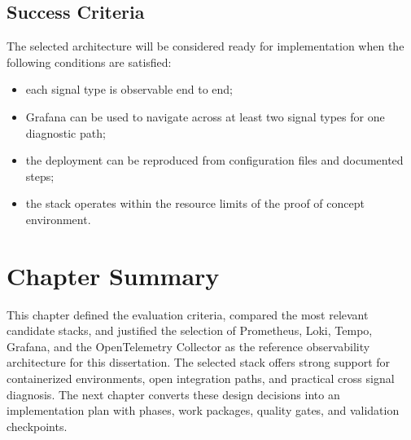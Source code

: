 \subsection{Success Criteria}
\label{subsec:validation_plan}

The selected architecture will be considered ready for implementation when the following conditions are satisfied:
\begin{itemize}
    \item each signal type is observable end to end;
    \item Grafana can be used to navigate across at least two signal types for one diagnostic path;
    \item the deployment can be reproduced from configuration files and documented steps;
    \item the stack operates within the resource limits of the proof of concept environment.
\end{itemize}

\section{Chapter Summary}
\label{sec:design_summary}

This chapter defined the evaluation criteria, compared the most relevant candidate stacks, and justified the selection of Prometheus, Loki, Tempo, Grafana, and the OpenTelemetry Collector as the reference observability architecture for this dissertation. The selected stack offers strong support for containerized environments, open integration paths, and practical cross signal diagnosis. The next chapter converts these design decisions into an implementation plan with phases, work packages, quality gates, and validation checkpoints.
